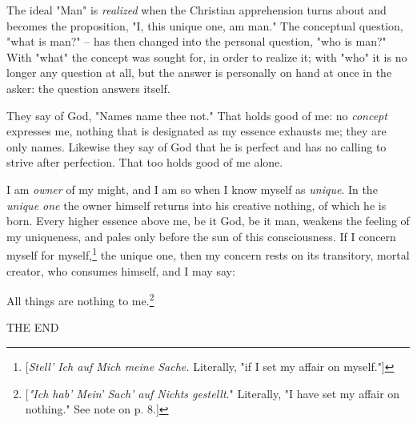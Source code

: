 \documentclass[a4paper]{book}
\begin{document}
The ideal "{}Man"{} is \textit{realized} when the Christian apprehension turns 
about and becomes the proposition, "{}I, this unique one, am man."{} The 
conceptual question, "{}what is man?"{} -- has then changed into the personal 
question, "{}who is man?"{} With "{}what"{} the concept was sought for, in 
order to realize it; with "{}who"{} it is no longer any question at all, but 
the answer is personally on hand at once in the asker: the question answers 
itself.

They say of God, "{}Names name thee not."{} That holds good of me: no 
\textit{concept} expresses me, nothing that is designated as my essence 
exhausts me; they are only names. Likewise they say of God that he is perfect 
and has no calling to strive after perfection. That too holds good of me 
alone.

I am \textit{owner} of my might, and I am so when I know myself as 
\textit{unique}. In the \textit{unique one} the owner himself returns into his 
creative nothing, of which he is born. Every higher essence above me, be it 
God, be it man, weakens the feeling of my uniqueness, and pales only before 
the sun of this consciousness. If I concern myself for 
myself,\footnote{[\textit{Stell' Ich auf Mich meine Sache.} Literally, "{}if I 
set my affair on myself."{}]} the unique one, then my concern rests on its 
transitory, mortal creator, who consumes himself, and I may say:

All things are nothing to me.\footnote{[\textit{"{}Ich hab' Mein' Sach' auf 
Nichts gestellt}."{} Literally, "{}I have set my affair on nothing."{} See 
note on p. 8.]}

\begin{center}
THE END\end{center}
\end{document}
